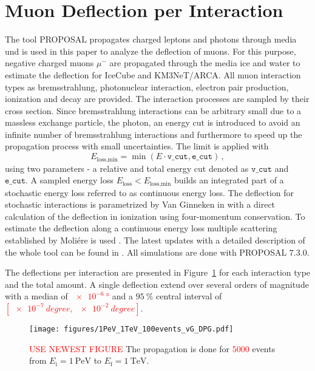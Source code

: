 \section{Muon Deflection per Interaction}\label{sec:defl_per_int}
The tool PROPOSAL propagates charged leptons and photons through media und is 
used in this paper to analyze the deflection of muons. For this purpose, 
negative charged muons $\mu^-$ are propagated through the media ice and water 
to estimate the deflection for IceCube and KM3NeT/ARCA. All muon interaction types as bremsstrahlung, photonuclear interaction, electron pair production, 
ionization and decay are provided. The interaction processes are sampled by their cross section. Since bremsstrahlung interactions can be 
arbitrary small due to a massless exchange particle, the photon, an energy cut is introduced to avoid an infinite number of bremsstrahlung interactions 
and furthermore to speed up the propagation process with small uncertainties.
The limit is applied with 
\begin{equation}
    E_{\text{loss,min}} = \min{(E \cdot \texttt{v\_cut}, \texttt{e\_cut})}\,,
\end{equation}
using two parameters - a relative and total energy cut denoted as 
$\texttt{v\_cut}$ and $\texttt{e\_cut}$. A sampled energy loss 
$E_{\text{loss}} < E_{\text{loss,min}}$ builds an integrated part of a 
stochastic energy loss referred to as continuous energy loss.
The deflection for stochastic interactions is parametrized by Van Ginneken 
in \cite{Van_Ginneken} with a direct calculation of the deflection in 
ionization using four-momentum conservation. To estimate the deflection along 
a continuous energy loss multiple scattering established by Moliére is used
\cite{moliere_scattering}. 
The latest updates with a detailed description of the whole tool can be found 
in \cite{phd_soedingrekso}.
All simulations are done with PROPOSAL $7.3.0$.


The deflections per interaction are presented in Figure~\ref{fig:defl_per_int} 
for each interaction type and the total amount. A single deflection 
extend over several orders of magnitude with a median of \textcolor{red}{$\SI{e-6}{\degree}$}
and a $\SI{95}{\percent}$ central interval of \textcolor{red}{$[\SI{e-7}{degree}, \,\SI{e-2}{degree}]$}.

\begin{figure}
    \centering 
    \texttt{[image: figures/1PeV\_1TeV\_100events\_vG\_DPG.pdf]}
    \caption{\textcolor{red}{USE NEWEST FIGURE} The propagation is done for \textcolor{red}{5000} 
    events from $E_{\text{i}} = \SI{1}{\peta\electronvolt}$ to $E_{\text{f}} = \SI{1}{\tera\electronvolt}$.}
    \label{fig:defl_per_int}
\end{figure}

